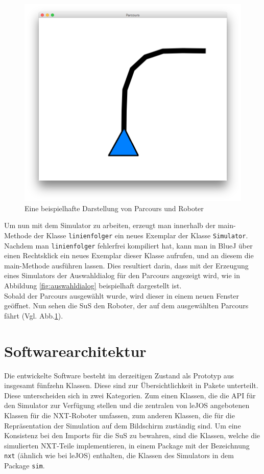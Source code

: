 \documentclass[paper=a4, DIV=calc, BCOR=15mm, twoside=on, onecolumn=on, open = right, titlepage =on, parskip =half, headsepline = on, footsepline = on, chapterprefix = off, appendixprefix = off, fontsize = 12pt, numbers = noenddot, abstract = on]{scrbook}
\begin{document}
\begin{figure}[htbp]
\centering
\includegraphics[width=\textwidth]{images/simparcours_kurve.png} 
\caption{Eine beispielhafte Darstellung von Parcours und Roboter}
\label{fig:simparcours_kurve}
\end{figure}

Um nun mit dem Simulator zu arbeiten, erzeugt man innerhalb der main-Methode der Klasse \texttt{linienfolger} ein neues Exemplar der Klasse \texttt{Simulator}. Nachdem man \texttt{linienfolger} fehlerfrei kompiliert hat, kann man in BlueJ über einen Rechtsklick ein neues Exemplar dieser Klasse aufrufen, und an diesem die main-Me\-tho\-de ausführen lassen. Dies resultiert darin, dass mit der Erzeugung eines Simulators der Auswahldialog für den Parcours angezeigt wird, wie in Abbildung \ref{fig:auswahldialog} beispielhaft dargestellt ist.\\
Sobald der Parcours ausgewählt wurde, wird dieser in einem neuen Fenster geöffnet. Nun sehen die SuS den Roboter, der auf dem ausgewählten Parcours fährt (Vgl. Abb.\ref{fig:simparcours_kurve}).
\vfill

\par \singlespacing
\section{Softwarearchitektur}
\onehalfspacing 

Die entwickelte Software besteht im derzeitigen Zustand als Prototyp aus insgesamt fünfzehn Klassen. Diese sind zur Übersichtlichkeit in Pakete unterteilt. Diese unterscheiden sich in zwei Kategorien. Zum einen Klassen, die die API für den Simulator zur Verfügung stellen und die zentralen von leJOS angebotenen Klassen für die NXT-Roboter umfassen, zum anderen Klassen, die für die Repräsentation der Simulation auf dem Bildschirm zuständig sind. Um eine Konsistenz bei den Imports für die SuS zu bewahren, sind die Klassen, welche die simulierten NXT-Teile implementieren, in einem Package mit der Bezeichnung \texttt{nxt} (ähnlich wie bei leJOS) enthalten, die Klassen des Simulators in dem Package \texttt{sim}. 
\end{document}
